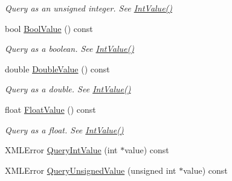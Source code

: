\begin{DoxyCompactItemize}
\begin{DoxyCompactList}\small\item\em Query as an unsigned integer. See \hyperlink{classtinyxml2_1_1_x_m_l_attribute_a949d02a5888092cc68c1e29185301863}{Int\-Value()} \end{DoxyCompactList}\item 
\hypertarget{classtinyxml2_1_1_x_m_l_attribute_afb444b7a12527f836aa161b54b2f7ce7}{bool \hyperlink{classtinyxml2_1_1_x_m_l_attribute_afb444b7a12527f836aa161b54b2f7ce7}{Bool\-Value} () const }\label{classtinyxml2_1_1_x_m_l_attribute_afb444b7a12527f836aa161b54b2f7ce7}

\begin{DoxyCompactList}\small\item\em Query as a boolean. See \hyperlink{classtinyxml2_1_1_x_m_l_attribute_a949d02a5888092cc68c1e29185301863}{Int\-Value()} \end{DoxyCompactList}\item 
\hypertarget{classtinyxml2_1_1_x_m_l_attribute_a336153e5aa1b7ccd6502fc249bfb3fd7}{double \hyperlink{classtinyxml2_1_1_x_m_l_attribute_a336153e5aa1b7ccd6502fc249bfb3fd7}{Double\-Value} () const }\label{classtinyxml2_1_1_x_m_l_attribute_a336153e5aa1b7ccd6502fc249bfb3fd7}

\begin{DoxyCompactList}\small\item\em Query as a double. See \hyperlink{classtinyxml2_1_1_x_m_l_attribute_a949d02a5888092cc68c1e29185301863}{Int\-Value()} \end{DoxyCompactList}\item 
\hypertarget{classtinyxml2_1_1_x_m_l_attribute_ae3d51ff98eacc1dc46efcfdaee5c84ad}{float \hyperlink{classtinyxml2_1_1_x_m_l_attribute_ae3d51ff98eacc1dc46efcfdaee5c84ad}{Float\-Value} () const }\label{classtinyxml2_1_1_x_m_l_attribute_ae3d51ff98eacc1dc46efcfdaee5c84ad}

\begin{DoxyCompactList}\small\item\em Query as a float. See \hyperlink{classtinyxml2_1_1_x_m_l_attribute_a949d02a5888092cc68c1e29185301863}{Int\-Value()} \end{DoxyCompactList}\item 
X\-M\-L\-Error \hyperlink{classtinyxml2_1_1_x_m_l_attribute_ad510a83c4ff2755844bb250b125d28ff}{Query\-Int\-Value} (int $\ast$value) const 
\item 
\hypertarget{classtinyxml2_1_1_x_m_l_attribute_ac93f5981adfd62ac4ea76bfa668ee2b4}{X\-M\-L\-Error \hyperlink{classtinyxml2_1_1_x_m_l_attribute_ac93f5981adfd62ac4ea76bfa668ee2b4}{Query\-Unsigned\-Value} (unsigned int $\ast$value) const }\label{classtinyxml2_1_1_x_m_l_attribute_ac93f5981adfd62ac4ea76bfa668ee2b4}


\end{DoxyCompactItemize}
